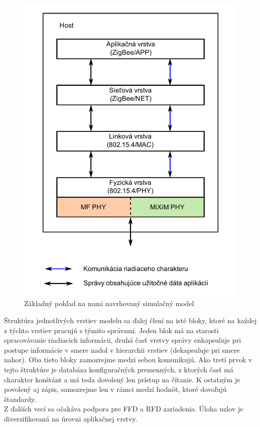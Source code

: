 \begin{figure}[htbp]
\begin{center}
\includegraphics[width=120mm]{figures/architecture_model}
\caption{Základný pohľad na nami navrhovaný simulačný model}
\label{fig:architecture_model}
\end{center}
\end{figure}

\indent\indent Štruktúra jednotlivých vrstiev modelu sa ďalej člení na isté bloky, ktoré na každej z týchto vrstiev pracujú s týmito správami. Jeden blok má na starosti spracovávanie riadiacich informácii, druhá časť vrstvy správy enkapsuluje pri postupe informácie v smere nadol v hierarchii vrstiev (dekapsuluje pri smere nahor). Oba tieto bloky zamozrejme medzi sebou komunikujú. Ako tretí prvok v tejto štruktúre je databáza konfiguračných premenných, z ktorých časť má charakter konštánt a má teda dovolený len prístup na čítanie. K ostatným je povolený aj zápis, samozrejme len v rámci medzí hodnôt, ktoré dovoľujú štandardy.\\
\indent\indent Z ďalších vecí sa očakáva podpora pre FFD a RFD zariadenia. Úloha uzlov je diverzifikovaná na úrovni aplikačnej vrstvy.\\

